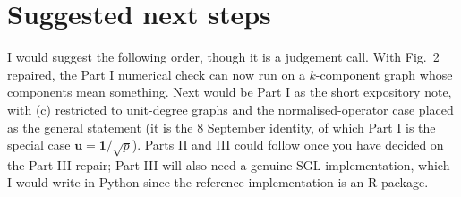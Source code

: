 \documentclass[11pt,a4paper]{article}
\newcommand{\one}{\mathbf{1}}
\begin{document}
\section{Suggested next steps}

I would suggest the following order, though it is a judgement call. With Fig.~2
repaired, the Part I numerical check can now run on a $k$-component graph whose
components mean something. Next would be Part I as the short expository note, with (c) restricted to unit-degree graphs and the
normalised-operator case placed as the general statement (it is the 8 September
identity, of which Part I is the special case $\mathbf{u}=\one/\sqrt p$). Parts II
and III could follow once you have decided on the Part III repair; Part III will also
need a genuine SGL implementation, which I would write in Python since the reference
implementation is an R package.
\end{document}
